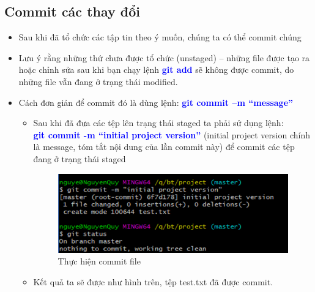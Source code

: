 \documentclass[12pt,a4paper]{report}
\begin{document}
\subsection{Commit các thay đổi}
\begin{itemize}
\item Sau khi đã tổ chức các tập tin theo ý muốn, chúng ta có thể commit chúng
\item Lưu ý rằng những thứ chưa được tổ chức (unstaged) – những file được tạo ra hoặc chỉnh sửa sau khi bạn chạy lệnh \textcolor{blue}{\bf git add} sẽ không được commit, do những file vẫn đang ở trạng thái modified.
\item Cách đơn giản để commit đó là dùng lệnh: \textcolor{blue}{\bf git commit –m “message”}
	\begin{itemize}
	\item Sau khi đã đưa các tệp lên trạng thái staged ta phải sử dụng lệnh:\\ \textcolor{blue}{\bf git commit -m “initial project version”} (initial project version chính là message, tóm tắt nội dung của lần commit này) để commit các tệp đang ở trạng thái staged

\begin{figure}[!ht]
	\centering
	\includegraphics[width=0.8\linewidth]{screenshot012}
\caption{Thực hiện commit file}
	\label{fig:screenshot012}
\end{figure}
	\item Kết quả ta sẽ được như hình trên, tệp test.txt đã được commit.
\end{itemize}
\end{itemize}
\end{document}
